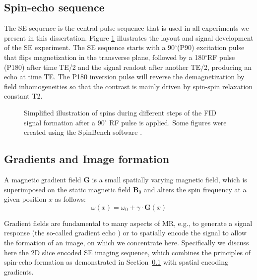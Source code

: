 \subsection{Spin-echo sequence}
\label{sec:chapter2 spin echo}
The {\gls{SE}} sequence is the central pulse sequence that is used in all experiments we present in this dissertation. Figure \ref{fig:chap2 SE sequence} illustrates the layout and signal development of the \gls{SE} experiment. The \gls{SE} sequence starts with a 90$^\circ$(P90) excitation pulse that flips magnetization in the transverse plane, followed by a 180$^\circ$RF pulse (P180) after time TE/2 and the signal readout after another TE/2, producing an echo at time TE. The P180 inversion pulse will reverse the demagnetization by field inhomogeneities so that the contrast is mainly driven by spin-spin relaxation constant  T2. 

\begin{figure}[ht]
\centering
{}
\caption{Simplified illustration of spins during different steps of the FID signal formation after a 90$^\circ$ RF pulse is applied. Some figures were created using the SpinBench software \citep{Overall:2007}.}
\label{fig:chap2 SE sequence}
\end{figure}


\subsection{Gradients and Image formation}
A magnetic gradient field $\textbf{G}$ is a small spatially varying magnetic field, which is superimposed on the static magnetic field $\mathbf{B}_{0}$ and alters the spin frequency at a given position $x$ as follows:
\begin{equation}
\omega(x)= \omega_0 + \gamma \cdot \textbf{G}(x)
\end{equation}

Gradient fields are fundamental to many aspects of MR, e.g., to generate a signal response (the so-called gradient echo ) or to spatially encode the signal to allow the formation of an image, on which we concentrate here.  Specifically we discuss here the 2D slice encoded SE imaging sequence, which combines the principles of spin-echo formation as demonstrated in Section~\ref{sec:chapter2 spin echo} with spatial encoding gradients.

